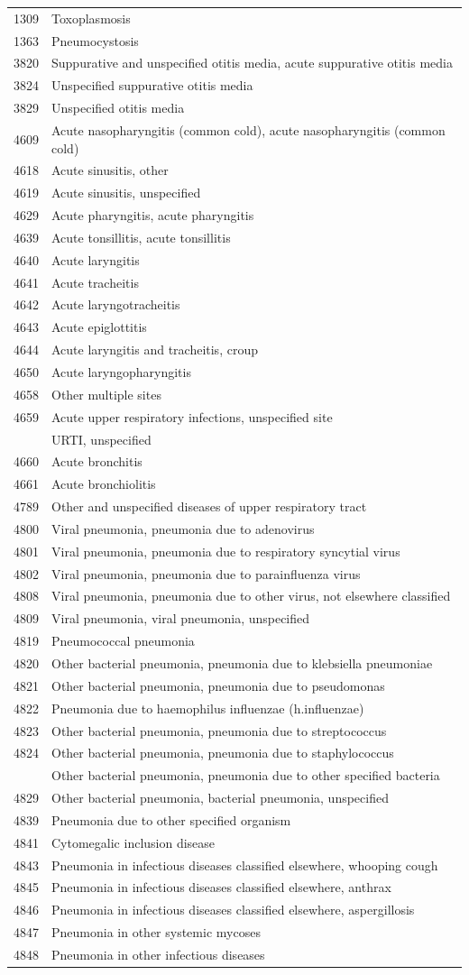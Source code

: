 \documentclass[]{article}\usepackage[]{graphicx}\usepackage[]{color}
\begin{document}
\begin{longtable}{ll}
1309&Toxoplasmosis\tabularnewline
1363&Pneumocystosis\tabularnewline
3820&Suppurative and unspecified otitis media, acute suppurative otitis media\tabularnewline
3824&Unspecified suppurative otitis media\tabularnewline
3829&Unspecified otitis media\tabularnewline
4609&Acute nasopharyngitis (common cold), acute nasopharyngitis (common cold)\tabularnewline
4618&Acute sinusitis, other\tabularnewline
4619&Acute sinusitis, unspecified\tabularnewline
4629&Acute pharyngitis, acute pharyngitis\tabularnewline
4639&Acute tonsillitis, acute tonsillitis\tabularnewline
4640&Acute laryngitis\tabularnewline
4641&Acute tracheitis\tabularnewline
4642&Acute laryngotracheitis\tabularnewline
4643&Acute epiglottitis\tabularnewline
4644&Acute laryngitis and tracheitis, croup\tabularnewline
4650&Acute laryngopharyngitis\tabularnewline
4658&Other multiple sites\tabularnewline
4659&Acute upper respiratory infections, unspecified site\tabularnewline
&URTI, unspecified\tabularnewline
4660&Acute bronchitis\tabularnewline
4661&Acute bronchiolitis\tabularnewline
4789&Other and unspecified diseases of upper respiratory tract\tabularnewline
4800&Viral pneumonia, pneumonia due to adenovirus\tabularnewline
4801&Viral pneumonia, pneumonia due to respiratory syncytial virus\tabularnewline
4802&Viral pneumonia, pneumonia due to parainfluenza virus\tabularnewline
4808&Viral pneumonia, pneumonia due to other virus, not elsewhere classified\tabularnewline
4809&Viral pneumonia, viral pneumonia, unspecified\tabularnewline
4819&Pneumococcal pneumonia\tabularnewline
4820&Other bacterial pneumonia, pneumonia due to klebsiella pneumoniae\tabularnewline
4821&Other bacterial pneumonia, pneumonia due to pseudomonas\tabularnewline
4822&Pneumonia due to haemophilus influenzae (h.influenzae)\tabularnewline
4823&Other bacterial pneumonia, pneumonia due to streptococcus\tabularnewline
4824&Other bacterial pneumonia, pneumonia due to staphylococcus\tabularnewline
\newpage
4828&Other bacterial pneumonia, pneumonia due to other specified bacteria\tabularnewline
4829&Other bacterial pneumonia, bacterial pneumonia, unspecified\tabularnewline
4839&Pneumonia due to other specified organism\tabularnewline
4841&Cytomegalic inclusion disease\tabularnewline
4843&Pneumonia in infectious diseases classified elsewhere, whooping cough\tabularnewline
4845&Pneumonia in infectious diseases classified elsewhere, anthrax\tabularnewline
4846&Pneumonia in infectious diseases classified elsewhere, aspergillosis\tabularnewline
4847&Pneumonia in other systemic mycoses\tabularnewline
4848&Pneumonia in other infectious diseases\tabularnewline

\end{longtable}
\end{document}
